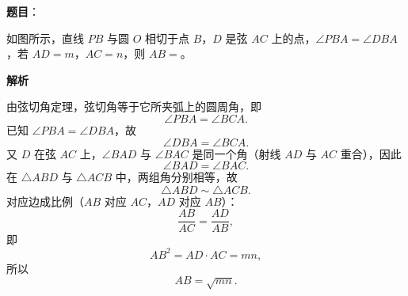 \begin{answer}

\textbf{题目}：

如图所示，直线 $PB$ 与圆 $O$ 相切于点 $B$，$D$ 是弦 $AC$ 上的点，$\angle PBA=\angle DBA$，若 $AD=m$，$AC=n$，则 $AB=$\gkblank{}。
\nopagebreak[4]
\begin{center}\end{center}
\nopagebreak[4]
\textbf{解析}

由弦切角定理，弦切角等于它所夹弧上的圆周角，即
\nopagebreak[4]
\[\angle PBA=\angle BCA.\]
已知 $\angle PBA=\angle DBA$，故
\nopagebreak[4]
\[\angle DBA=\angle BCA.\]
又 $D$ 在弦 $AC$ 上，$\angle BAD$ 与 $\angle BAC$ 是同一个角（射线 $AD$ 与 $AC$ 重合），因此
\nopagebreak[4]
\[\angle BAD=\angle BAC.\]
在 $\triangle ABD$ 与 $\triangle ACB$ 中，两组角分别相等，故
\nopagebreak[4]
\[\triangle ABD\sim\triangle ACB.\]
对应边成比例（$AB$ 对应 $AC$，$AD$ 对应 $AB$）：
\nopagebreak[4]
\[\frac{AB}{AC}=\frac{AD}{AB},\]
即
\nopagebreak[4]
\[AB^2=AD\cdot AC=mn,\]
所以
\nopagebreak[4]
\[AB=\sqrt{mn}.\]


\end{answer}
